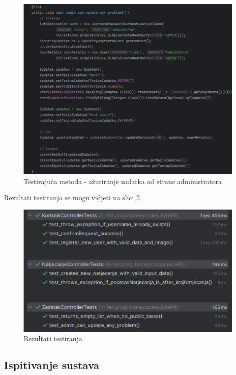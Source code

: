 \begin{figure}[H]
	\includegraphics[scale=0.13]{slike/test7.png}
	\centering
	\caption{Testirajuća metoda - ažuriranje zadatka od strane administratora}
	\label{fig:test7}
\end{figure}

\noindent Rezultati testiranja se mogu vidjeti na slici \ref{fig:test_rezultati}.

\begin{figure}[H]
	\includegraphics[scale=0.8]{slike/test_rezultati.png}
	\centering
	\caption{Rezultati testiranja}
	\label{fig:test_rezultati}
\end{figure}

\subsection{Ispitivanje sustava}

